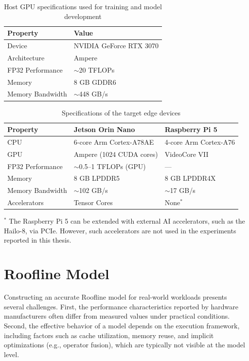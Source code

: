 \documentclass[12pt,a4paper]{report}
\begin{document}
\begin{table}[H]
\centering
\caption{Host GPU specifications used for training and model development}
\label{tab:gpu_specs}
\begin{tabular}{@{}ll@{}}
\toprule
\textbf{Property} & \textbf{Value} \\
\midrule
Device            & NVIDIA GeForce RTX 3070 \\
Architecture      & Ampere \\
FP32 Performance  & $\sim$20 TFLOPs \\
Memory            & 8 GB GDDR6 \\
Memory Bandwidth  & $\sim$448 GB/s \\
\bottomrule
\end{tabular}
\end{table}

\begin{table}[H]
\centering
\caption{Specifications of the target edge devices}
\label{tab:edge_specs}
\begin{tabular}{@{}lll@{}}
\toprule
\textbf{Property} & \textbf{Jetson Orin Nano} & \textbf{Raspberry Pi 5} \\
\midrule
CPU              & 6-core Arm Cortex-A78AE   & 4-core Arm Cortex-A76 \\
GPU              & Ampere (1024 CUDA cores)  & VideoCore VII \\
FP32 Performance & $\sim$0.5--1 TFLOPs (GPU) & --- \\
Memory           & 8 GB LPDDR5               & 8 GB LPDDR4X \\
Memory Bandwidth & $\sim$102 GB/s             & $\sim$17 GB/s \\
Accelerators     & Tensor Cores              & None$^{*}$ \\
\bottomrule
\end{tabular}

\vspace{0.5em}
\raggedright
{\footnotesize
$^{*}$ The Raspberry Pi 5 can be extended with external AI accelerators, such as the Hailo-8, via PCIe. However,
    such accelerators are not used in the experiments reported in this thesis.
}
\end{table}


\section{Roofline Model}
\label{sec:roofline_analysis}

Constructing an accurate Roofline model for real-world workloads presents several challenges.
First, the performance characteristics reported by hardware manufacturers often differ from
measured values under practical conditions. Second, the effective behavior of a model depends
on the execution framework, including factors such as cache utilization, memory reuse, and
implicit optimizations (e.g., operator fusion), which are typically not visible at the model level.
\end{document}
